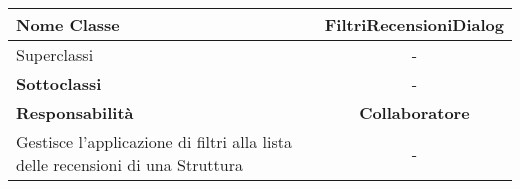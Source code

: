 
\setcounter{table}{0}
\begin{table}[H]
    \centering
    \begin{tabularx}{\textwidth}{||   X  ||  c   ||}
        \hline
        \rowcolor{Gray}
        \textbf{Nome Classe} & FiltriRecensioniDialog\\
        \hline
        Superclassi                                             &  - \\
        \hline
        \textbf{Sottoclassi}                                    & - \\
        \hline
        \hline
        \textbf{Responsabilità}                                 & \textbf{Collaboratore} \\
        \hline
        Gestisce l'applicazione di filtri alla lista delle recensioni di una Struttura   & - \\
        \hline
    \end{tabularx}
\end{table}
